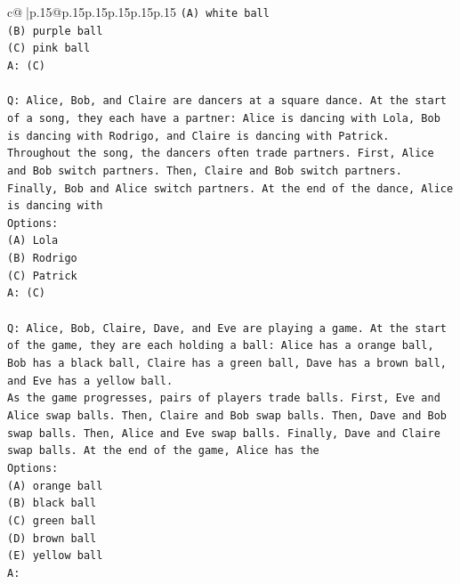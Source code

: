 \documentclass{article}
\begin{document}
{\begin{supertabular}{c@{$\;$}|p{.15\linewidth}@{}p{.15\linewidth}p{.15\linewidth}p{.15\linewidth}p{.15\linewidth}p{.15\linewidth}}
{{{\texttt{(A) white ball} \\
\texttt{(B) purple ball} \\
\texttt{(C) pink ball} \\
\texttt{A: (C)} \\
\\ 
\texttt{Q: Alice, Bob, and Claire are dancers at a square dance. At the start of a song, they each have a partner: Alice is dancing with Lola, Bob is dancing with Rodrigo, and Claire is dancing with Patrick.} \\
\texttt{Throughout the song, the dancers often trade partners. First, Alice and Bob switch partners. Then, Claire and Bob switch partners. Finally, Bob and Alice switch partners. At the end of the dance, Alice is dancing with} \\
\texttt{Options:} \\
\texttt{(A) Lola} \\
\texttt{(B) Rodrigo} \\
\texttt{(C) Patrick} \\
\texttt{A: (C)} \\
\\ 
\texttt{Q: Alice, Bob, Claire, Dave, and Eve are playing a game. At the start of the game, they are each holding a ball: Alice has a orange ball, Bob has a black ball, Claire has a green ball, Dave has a brown ball, and Eve has a yellow ball.} \\
\texttt{As the game progresses, pairs of players trade balls. First, Eve and Alice swap balls. Then, Claire and Bob swap balls. Then, Dave and Bob swap balls. Then, Alice and Eve swap balls. Finally, Dave and Claire swap balls. At the end of the game, Alice has the} \\
\texttt{Options:} \\
\texttt{(A) orange ball} \\
\texttt{(B) black ball} \\
\texttt{(C) green ball} \\
\texttt{(D) brown ball} \\
\texttt{(E) yellow ball} \\
\texttt{A:} \\
            }
        }
    }
     \\ \\


\end{supertabular}}
\end{document}
